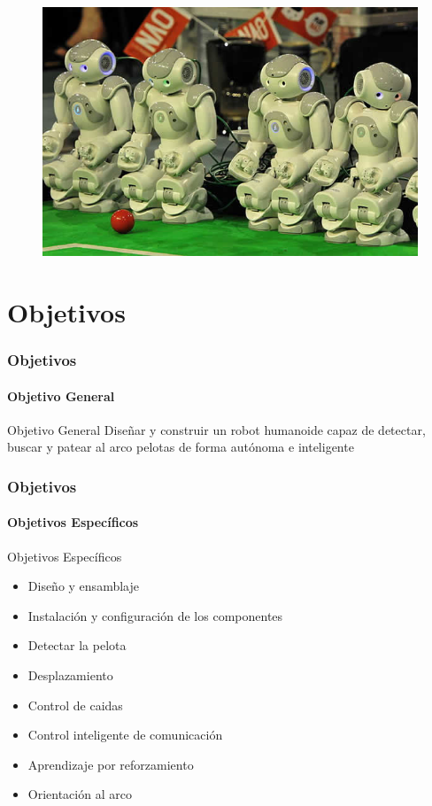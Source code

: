 \documentclass{beamer}
\begin{document}
\begin{frame}
\begin{figure}
\includegraphics[scale=0.5]{13-06-28-robocup-eindhoven.jpg} 

\end{figure}
\end{frame}

\section{Objetivos}
\begin{frame}
  \frametitle{Objetivos}
  \framesubtitle{Objetivo General}

  \begin{block}{Objetivo General}
	Dise\~nar y construir un robot humanoide capaz de detectar, buscar y patear al arco pelotas de forma aut\'onoma e inteligente
   \end{block}
\end{frame}
\begin{frame}
  \frametitle{Objetivos}
  \framesubtitle{Objetivos Espec\'{i}ficos}
  \begin{block}{Objetivos Espec\'{i}ficos}
  \begin{itemize}
    \item Dise\~no y ensamblaje
    \item Instalaci\'on y configuraci\'on de los componentes 
    \item Detectar la pelota
    \item Desplazamiento 
    \item Control de caidas
    \item Control inteligente de comunicaci\'on
    \item Aprendizaje por reforzamiento 
    \item Orientaci\'on al arco 
    \end{itemize}
  \end{block}
\end{frame}
\end{document}
